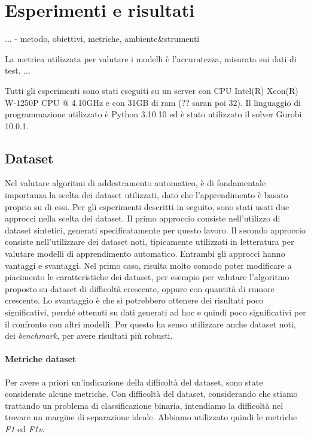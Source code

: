 \chapter{Esperimenti e risultati}
\label{chap:esperimenti}


...
 - metodo, obiettivi, metriche, ambiente\&strumenti
 
La metrica utilizzata per valutare i modelli è l'accuratezza, misurata sui dati di test. 
...


Tutti gli esperimenti sono stati eseguiti su un server con CPU Intel(R) Xeon(R) W-1250P CPU @ 4.10GHz e con 31GB di ram (?? saran poi 32). Il linguaggio di programmazione utilizzato è Python 3.10.10 ed è stato utilizzato il solver Gurobi 10.0.1. 

\section{Dataset}
Nel valutare algoritmi di addestramento automatico, è di fondamentale importanza la scelta dei dataset utilizzati, dato che l'apprendimento è basato proprio su di essi. Per gli esperimenti descritti in seguito, sono stati usati due approcci nella scelta dei dataset. Il primo approccio consiste nell'utilizzo di dataset sintetici, generati specificatamente per questo lavoro. Il secondo approccio consiste nell'utilizzare dei dataset noti, tipicamente utilizzati in letteratura per valutare modelli di apprendimento automatico. Entrambi gli approcci hanno vantaggi e svantaggi. Nel primo caso, risulta molto comodo poter modificare a piacimento le caratteristiche dei dataset, per esempio per valutare l'algoritmo proposto su dataset di difficoltà crescente, oppure con quantità di rumore crescente. Lo svantaggio è che si potrebbero ottenere dei risultati poco significativi, perché ottenuti su dati generati ad hoc e quindi poco significativi per il confronto con altri modelli. Per questo ha senso utilizzare anche dataset noti, dei \textit{benchmark}, per avere risultati più robusti.

\subsubsection{Metriche dataset}
Per avere a priori un'indicazione della difficoltà del dataset, sono state considerate alcune metriche.
Con difficoltà del dataset, considerando che stiamo trattando un problema di classificazione binaria, intendiamo la difficoltà nel trovare un margine di separazione ideale. Abbiamo utilizzato quindi le metriche \textit{F1} ed \textit{F1v}.

